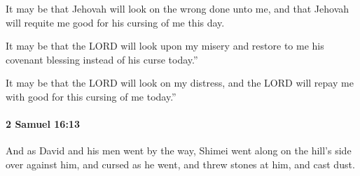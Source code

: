 			\begin{versebox}
					\item[BHS] 
					\item[ASV] It may be that Jehovah will look on the wrong done unto me, and that Jehovah will requite me good for his cursing of me this day.
					\item[NIV] It may be that the LORD will look upon my misery and restore to me his covenant blessing instead of his curse today.”
					\item[NRSV] It may be that the LORD will look on my distress, and the LORD will repay me with good for this cursing of me today.”
			\end{versebox}

		\paragraph{2 Samuel 16:13} %
			\label{2SAMUEL-16-13}

			And as David and his men went by the way, Shimei went along on the hill’s side over against him, and cursed as he went, and threw stones at him, and cast dust.

